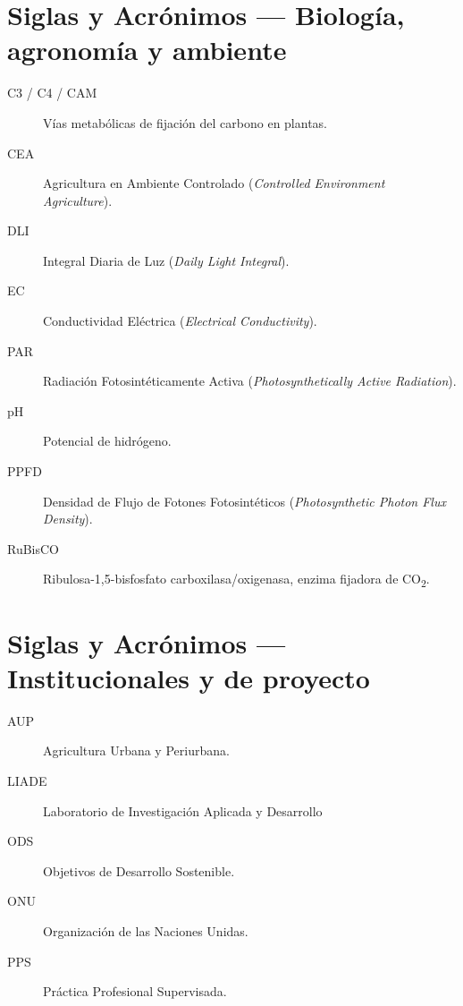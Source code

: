 \section*{Siglas y Acrónimos --- Biología, agronomía y ambiente}
\begin{description}
    \item[C3 / C4 / CAM] Vías metabólicas de fijación del carbono en plantas.
    \item[CEA] Agricultura en Ambiente Controlado (\textit{Controlled Environment Agriculture}).
    \item[DLI] Integral Diaria de Luz (\textit{Daily Light Integral}).
    \item[EC] Conductividad Eléctrica (\textit{Electrical Conductivity}).
    \item[PAR] Radiación Fotosintéticamente Activa (\textit{Photosynthetically Active Radiation}).
    \item[pH] Potencial de hidrógeno.
    \item[PPFD] Densidad de Flujo de Fotones Fotosintéticos (\textit{Photosynthetic Photon Flux Density}).
    \item[RuBisCO] Ribulosa-1,5-bisfosfato carboxilasa/oxigenasa, enzima fijadora de CO\textsubscript{2}.
\end{description}

\section*{Siglas y Acrónimos --- Institucionales y de proyecto}
\begin{description}
    \item[AUP] Agricultura Urbana y Periurbana.
    \item[LIADE] Laboratorio de Investigación Aplicada y Desarrollo
    \item[ODS] Objetivos de Desarrollo Sostenible.
    \item[ONU] Organización de las Naciones Unidas.
    \item[PPS] Práctica Profesional Supervisada.
\end{description}